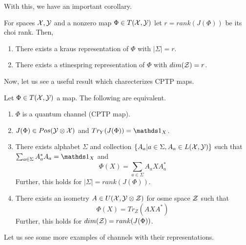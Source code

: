 With this, we have an important corollary.
\begin{corollary}
For spaces $\mathcal{X},\mathcal{Y}$ and a nonzero map $\Phi\in T(\mathcal{X},\mathcal{Y})$ let $r = rank(J(\Phi))$ be its choi rank. Then,
\begin{enumerate}
    \item There exists a kraus representation of $\Phi$ with $|\Sigma| = r$.
    \item There exists a stinespring representation of $\Phi$ with $dim(\mathcal{Z}) = r$.
\end{enumerate}
\end{corollary}
Now, let us see a useful result which charecterizes CPTP maps.
\begin{theorem}
Let $\Phi\in T(\mathcal{X},\mathcal{Y})$ a map. The following are equivalent.
\begin{enumerate}
    \item $\Phi$ is a quantum channel (CPTP map).
    \item $J(\Phi) \in Pos(\mathcal{Y}\otimes\mathcal{X})$ and $Tr_Y(J(\Phi)) = \iden_X$.
    \item There exists alphabet $\Sigma$ and collection $\{A_a|a\in\Sigma,A_a \in L(\mathcal{X},\mathcal{Y})\}$ such that $\sum_{a\in\Sigma}A_a^*A_a = \iden_X$ and
    \[\Phi(X) = \sum_{a\in\Sigma}A_aXA_a^*\]
    Further, this holds for $|\Sigma| = rank(J(\Phi))$.
    \item There exists an isometry $A\in U(\mathcal{X},\mathcal{Y}\otimes\mathcal{Z})$ for osme space $\mathcal{Z}$ such that
    \[\Phi(X) = Tr_Z(AXA^*)\]
    Further, this holds for $dim(\mathcal{Z}) = rank(J(\Phi))$.
\end{enumerate}
\end{theorem}
Let us see some more examples of channels with their representations.
